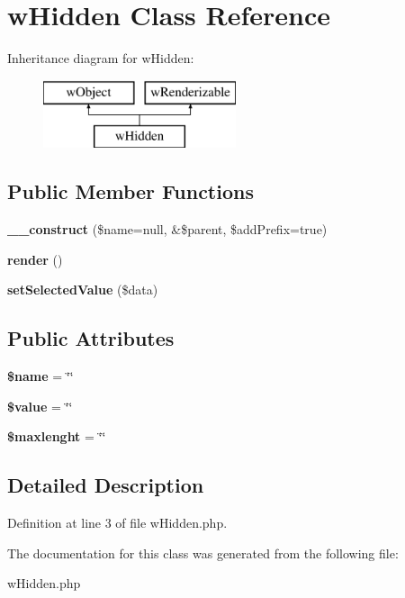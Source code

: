 \hypertarget{classwHidden}{
\section{wHidden Class Reference}
\label{classwHidden}
}
Inheritance diagram for wHidden:\begin{figure}[H]
\begin{center}
\leavevmode
\includegraphics[height=2.000000cm]{classwHidden}
\end{center}
\end{figure}
\subsection*{Public Member Functions}
\begin{DoxyCompactItemize}
\item 
\hypertarget{classwHidden_af52f2782a69582ed2b435e25d81867ca}{
{\bfseries \_\-\_\-construct} (\$name=null, \&\$parent, \$addPrefix=true)}
\label{classwHidden_af52f2782a69582ed2b435e25d81867ca}

\item 
\hypertarget{classwHidden_a61f2b2f60a9e2f72e79bec91b59bf135}{
{\bfseries render} ()}
\label{classwHidden_a61f2b2f60a9e2f72e79bec91b59bf135}

\item 
\hypertarget{classwHidden_acc6abbf19048aeae0a17d7db83a370e4}{
{\bfseries setSelectedValue} (\$data)}
\label{classwHidden_acc6abbf19048aeae0a17d7db83a370e4}

\end{DoxyCompactItemize}
\subsection*{Public Attributes}
\begin{DoxyCompactItemize}
\item 
\hypertarget{classwHidden_a3c7d143be7addb0f0b33c904a634788c}{
{\bfseries \$name} = \char`\"{}\char`\"{}}
\label{classwHidden_a3c7d143be7addb0f0b33c904a634788c}

\item 
\hypertarget{classwHidden_a61338ec10362c659edbe1e0cabf055b9}{
{\bfseries \$value} = \char`\"{}\char`\"{}}
\label{classwHidden_a61338ec10362c659edbe1e0cabf055b9}

\item 
\hypertarget{classwHidden_ad781727984fe8efd282debcb4ee190a2}{
{\bfseries \$maxlenght} = \char`\"{}\char`\"{}}
\label{classwHidden_ad781727984fe8efd282debcb4ee190a2}

\end{DoxyCompactItemize}


\subsection{Detailed Description}


Definition at line 3 of file wHidden.php.



The documentation for this class was generated from the following file:\begin{DoxyCompactItemize}
\item 
wHidden.php\end{DoxyCompactItemize}
